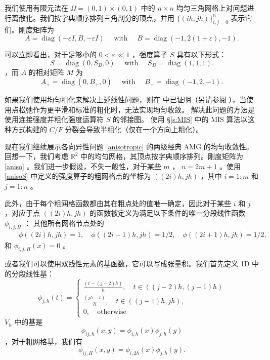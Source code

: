\documentclass[12pt]{acta_2011xz}
\begin{document}
我们使用有限元法在    $\Omega=(0, 1)\times (0,
1)$    中的
   $n\times n$    均匀三角网格上对问题进行离散化。我们按字典顺序排列三角剖分的顶点，并用    $ \{ (ih,jh) \} _{i,j=0}^n$    表示它们。刚度矩阵为
   \begin{equation}\label{aniso}
    A=\operatorname{diag}(-\varepsilon I, B, -\varepsilon I) \quad \text{ with } \quad B=\operatorname{diag}(-1, 2(1+\varepsilon), -1).
\end{equation}     

可以立即看出，对于足够小的    $0<\varepsilon\ll 1$   ，强度算子    $S$    具有以下形式：
   \begin{equation}\label{anisoS}
    S=\operatorname{diag}(0, S_B, 0) \quad \text{ with } \quad 
S_B=\operatorname{diag}(1, 1, 1).
\end{equation}   ，而    $A$    的相对矩阵    $M$    为
   \begin{equation}
    A_+=\operatorname{diag}(0, B_+, 0) \quad \text{ with } \quad 
B_+=\operatorname{diag}(-1, 2, -1).
\end{equation}     

如果我们使用均匀粗化来解决上述线性问题，则在    \cite{yu2013analysis}    中已证明（另请参阅    \cite{2008ZikatanovL-aa}    ），当使用点松弛作为更平滑和标准的粗化时，无法实现均匀收敛。 解决此问题的方法是使用连接强度并粗化强度运算符    $S$    的邻接图。 使用    \S       \ref{s:MIS}    中的 MIS 算法以这种方式构建的    $C/F$    分裂会导致半粗化（仅在一个方向上粗化）。  

现在我们继续展示各向异性问题    \eqref{anisotropic}    的两级经典 AMG 的均匀收敛性。回想一下，我们考虑    $\mathbb{R}^2$    中的均匀网格，其顶点按字典顺序排列。刚度矩阵为    \eqref{aniso}    。我们进一步假设，不失一般性，对于某些    $m$    ，    $n=2m+1$    。使用    \eqref{anisoS}    中定义的强度算子的粗网格点的坐标为    $((2i)h,jh)$    ，其中    $i=1:m$    和    $j=1:n$    。  

此外，由于每个粗网格函数都由其在粗点处的值唯一确定，因此对于某些    $i$    和    $j$   ，对应于点    $((2i)h,jh)$    的函数被定义为满足以下条件的唯一分段线性函数    $\phi_{i, j,H}$   ：
其他所有网格节点处的    \begin{eqnarray*}
&&\phi((2i)h,jh) = 1, \quad 
\phi((2i-1)h,jh) = 1/2, \quad 
\phi((2i+1)h,jh) = 1/2,
\end{eqnarray*}    和    $\phi_{i,j, H}(x) = 0$   。  

或者我们可以使用双线性元素的基函数，它可以写成张量积。我们首先定义 1D 中的分段线性基：
   \[
\phi_{j,h}(t) = 
\begin{cases}
\frac{(t-(j-2)h)}{h},\quad t\in ((j-2)h,(j-1)h) \\ 
\frac{(jh-t)}{h},\quad t\in ((j-1)h,jh), \\ 
0,\quad\mbox{otherwise}
\end{cases}
\]       $V_h$    中的基是
   \begin{equation}\label{bilinear_fine}
  \phi_{ij,h}(x,y) = \phi_{i,h}(x)\phi_{j,h}(y)  
\end{equation}   ，对于粗网格基，我们有
   \begin{equation}\label{bilinear_coarse}
\phi_{ij,H}(x,y) = \phi_{i,2h}(x)\phi_{j,h}(y).
\end{equation}     
\end{document}
